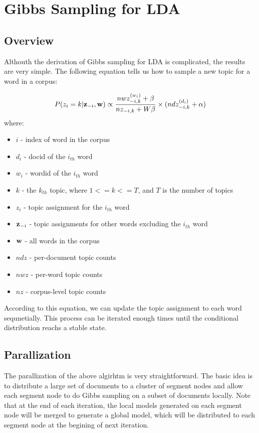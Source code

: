\section{Gibbs Sampling for LDA}
\subsection{Overview}
Althouth the derivation of Gibbs sampling for LDA is complicated, the results are very simple. The following equation tells us how to sample a new topic for a word in a corpus: 

\begin{equation}
P(z_i=k|{\bf z}_{-i},{\bf w}) \propto \frac{nwz_{-i,k}^{(w_i)} +\beta}{nz_{-i,k}+W \beta}\times(ndz_{-i,k}^{(d_i)}+\alpha)
\end{equation}
where:
\begin{itemize}
\item $i$ - index of word in the corpus
\item $d_i$ - docid of the $i_{th}$ word
\item $w_i$ - wordid of the $i_{th}$ word
\item $k$ - the $k_{th}$ topic, where $1 <= k <= T$, and $T$ is the number of topics
\item $z_i$ - topic assignment for the $i_{th}$ word
\item ${\bf z}_{-i}$ - topic assignments for other words excluding the $i_{th}$ word
\item ${\bf w}$ - all words in the corpus
\item $ndz$ - per-document topic counts
\item $nwz$ - per-word topic counts 
\item $nz$ - corpus-level topic counts
\end{itemize}

According to this equation, we can update the topic assignment to each word sequnetially. This process can be iterated enough times until the conditional distribution reachs a stable state.

\subsection{Parallization}
The parallization of the above algirhtm is very straightforward. The basic idea is to distribute a large set of documents to a cluster of segment nodes and allow each segment node to do Gibbs sampling on a subset of documents locally. Note that at the end of each iteration, the local models generated on each segment node will be merged to generate a global model, which will be distributed to each segment node at the begining of next iteration. 

